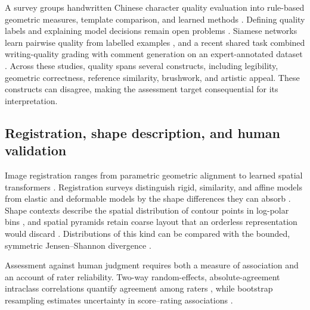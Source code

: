 A survey groups handwritten Chinese character quality evaluation into
rule-based geometric measures, template comparison, and learned methods
\cite{chen2024qualitysurvey}. Defining quality labels and explaining model
decisions remain open problems \cite{chen2024qualitysurvey}. Siamese networks learn pairwise quality from
labelled examples \cite{chen2025siamhcc}, and a recent shared task combined
writing-quality grading with comment generation on an expert-annotated
dataset \cite{liu2025calligraphyeval}. Across these studies, quality spans
several constructs, including legibility, geometric correctness, reference
similarity, brushwork, and artistic appeal. These constructs can disagree,
making the assessment target consequential for its interpretation.

\subsection{Registration, shape description, and human validation}

Image registration ranges from parametric geometric alignment to learned
spatial transformers \cite{zitova2003registration,jaderberg2015stn}.
Registration surveys distinguish rigid, similarity, and affine models from
elastic and deformable models by the shape differences they can absorb
\cite{zitova2003registration}. Shape contexts describe the
spatial distribution of contour points in log-polar bins
\cite{belongie2002shapecontext}, and spatial pyramids retain coarse layout
that an orderless representation would discard
\cite{lazebnik2006spatialpyramid}. Distributions of this kind can be compared
with the bounded, symmetric Jensen--Shannon divergence \cite{lin1991jensen}.

Assessment against human judgment requires both a measure of association
and an account of rater reliability. Two-way random-effects,
absolute-agreement intraclass correlations quantify agreement among raters
\cite{mcgraw1996icc,koo2016icc}, while bootstrap resampling estimates
uncertainty in score--rating associations
\cite{efron1993bootstrap}.
